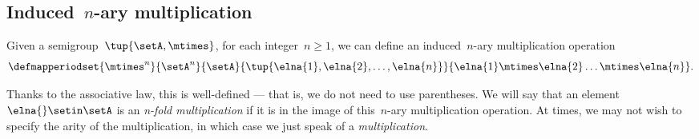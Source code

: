 \subsection{Induced~$n$-ary multiplication}
Given a semigroup~$\tup{\setA, \mtimes}$, for each integer~$n\geq1$, we can define an induced~$n$-ary multiplication operation
%
\begin{equation}
    \defmapperiodset{\mtimes^n}{\setA^n}{\setA}{\tup{\elna{1}, \elna{2}, \ldots, \elna{n}}}{ \elna{1} \mtimes \elna{2} \ldots \mtimes \elna{n}}.
\end{equation}


Thanks to the associative law, this is well-defined — that is, we do not need to use parentheses.
We will say that an element~$\elna{} \setin \setA$ is an \emph{n-fold multiplication} if it is in the image of this~$n$-ary multiplication operation.
At times, we may not wish to specify the arity of the multiplication, in which case we just speak of a \emph{multiplication}.

\showslides{
    \begin{forslides}
        \begin{equation}
            \label{eq:sg-mora}
            \mora
        \end{equation}
        \begin{equation}
            \label{eq:sg-morb}
            \morb
        \end{equation}
        \begin{equation}
            \label{eq:sg-morab}
            \mora\then\morb
        \end{equation}
    \end{forslides}
}
